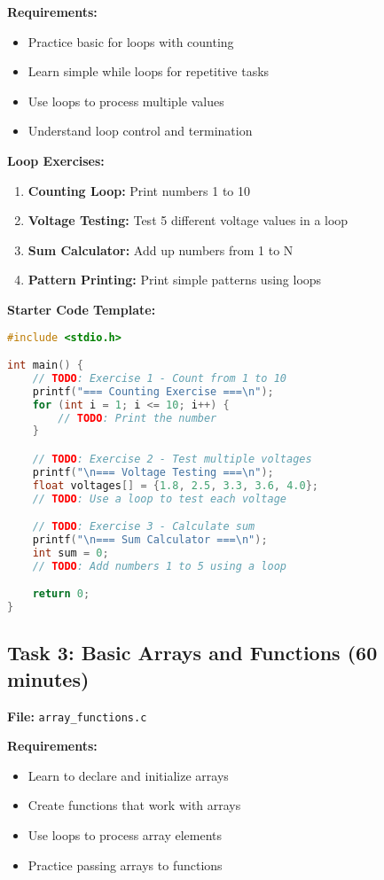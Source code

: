 \documentclass[11pt,a4paper]{article}
\begin{document}
\textbf{Requirements:}
\begin{itemize}
    \item Practice basic for loops with counting
    \item Learn simple while loops for repetitive tasks
    \item Use loops to process multiple values
    \item Understand loop control and termination
\end{itemize}

\textbf{Loop Exercises:}
\begin{enumerate}
    \item \textbf{Counting Loop:} Print numbers 1 to 10
    \item \textbf{Voltage Testing:} Test 5 different voltage values in a loop
    \item \textbf{Sum Calculator:} Add up numbers from 1 to N
    \item \textbf{Pattern Printing:} Print simple patterns using loops
\end{enumerate}

\textbf{Starter Code Template:}
\begin{lstlisting}[language=C]
#include <stdio.h>

int main() {
    // TODO: Exercise 1 - Count from 1 to 10
    printf("=== Counting Exercise ===\n");
    for (int i = 1; i <= 10; i++) {
        // TODO: Print the number
    }

    // TODO: Exercise 2 - Test multiple voltages
    printf("\n=== Voltage Testing ===\n");
    float voltages[] = {1.8, 2.5, 3.3, 3.6, 4.0};
    // TODO: Use a loop to test each voltage

    // TODO: Exercise 3 - Calculate sum
    printf("\n=== Sum Calculator ===\n");
    int sum = 0;
    // TODO: Add numbers 1 to 5 using a loop

    return 0;
}
\end{lstlisting}

\subsection{Task 3: Basic Arrays and Functions (60 minutes)}

\textbf{File:} \texttt{array\_functions.c}

\textbf{Requirements:}
\begin{itemize}
    \item Learn to declare and initialize arrays
    \item Create functions that work with arrays
    \item Use loops to process array elements
    \item Practice passing arrays to functions
\end{itemize}
\end{document}
